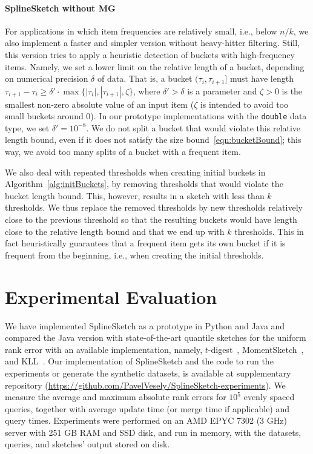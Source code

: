 \documentclass[acmsmall]{acmart}
\theoremstyle{remark}
\begin{document}
\vspace{-0.2cm}

\paragraph{SplineSketch without MG}
For applications in which item frequencies are relatively small, i.e., below $n/k$,
we also implement a faster and simpler version without heavy-hitter filtering.
Still, this version tries to apply a heuristic detection of buckets with high-frequency items.
Namely, we set a lower limit on the relative length of a bucket, depending on numerical precision $\delta$ of data.
That is, a bucket $(\tau_i, \tau_{i+1}]$ must have length $\tau_{i+1} - \tau_i \ge \delta'\cdot \max\{|\tau_i|, |\tau_{i+1}|, \zeta\}$,
where $\delta' > \delta$ is a parameter and
$\zeta >0$ is the smallest non-zero absolute value of an input item ($\zeta$ is intended to avoid too small buckets around 0).
In our prototype implementations with the \texttt{double} data type, we set $\delta' = 10^{-8}$.
We do not split a bucket that would violate this relative length bound, even if it does not satisfy the size bound~\eqref{eqn:bucketBound}; this way, we avoid too many splits of a bucket with a frequent item.


We also deal with repeated thresholds when creating initial buckets in Algorithm~\ref{alg:initBuckets},
by removing thresholds that would violate the bucket length bound.
This, however, results in a sketch with less than $k$ thresholds.
We thus replace the removed thresholds by new thresholds relatively close to the previous threshold so that the resulting buckets would have length close to the relative length bound and that we end up with $k$ thresholds.
This in fact heuristically guarantees that a frequent item gets its own bucket
if it is frequent from the beginning, i.e., when creating the initial thresholds.




\section{Experimental Evaluation}\label{sec:experiments}

We have implemented SplineSketch as a prototype in Python and Java and 
compared the Java version with state-of-the-art quantile sketches for the uniform rank error
with an available implementation,
namely, $t$-digest~\cite{dunning19-t-digest}, MomentSketch~\cite{GanDTSB18}, and KLL~\cite{KarninLL16}.
Our implementation of SplineSketch and the code to run the experiments or generate the synthetic datasets,
is available at supplementary repository (\url{https://github.com/PavelVesely/SplineSketch-experiments}).
We measure the average and maximum absolute rank errors for $10^5$ evenly spaced queries,
together with average update time (or merge time if applicable) and query times.
Experiments were performed on an AMD EPYC 7302 (3 GHz) server with 251 GB RAM and SSD disk,
and run in memory, with the datasets, queries, and sketches' output stored on disk.
\end{document}
